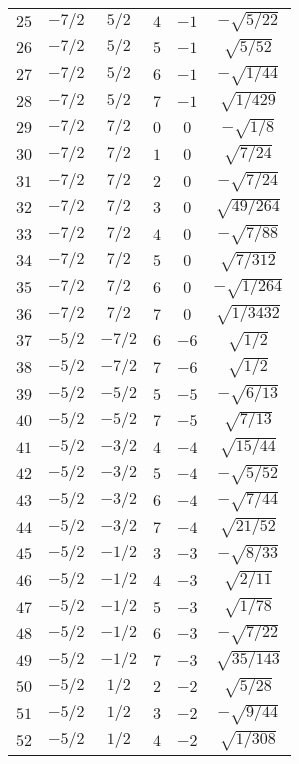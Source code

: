 \begin{table}
\begin{center}
\begin{tabular}{|c|c|c|c|c|c|}
$25$ & $-7/2$ & $5/2$ & $4$ & $-1$ & $-\sqrt{5/22}$ \\ 
$26$ & $-7/2$ & $5/2$ & $5$ & $-1$ & $\sqrt{5/52}$ \\ 
$27$ & $-7/2$ & $5/2$ & $6$ & $-1$ & $-\sqrt{1/44}$ \\ 
$28$ & $-7/2$ & $5/2$ & $7$ & $-1$ & $\sqrt{1/429}$ \\ 
$29$ & $-7/2$ & $7/2$ & $0$ & $0$ & $-\sqrt{1/8}$ \\ 
$30$ & $-7/2$ & $7/2$ & $1$ & $0$ & $\sqrt{7/24}$ \\ 
$31$ & $-7/2$ & $7/2$ & $2$ & $0$ & $-\sqrt{7/24}$ \\ 
$32$ & $-7/2$ & $7/2$ & $3$ & $0$ & $\sqrt{49/264}$ \\ 
$33$ & $-7/2$ & $7/2$ & $4$ & $0$ & $-\sqrt{7/88}$ \\ 
$34$ & $-7/2$ & $7/2$ & $5$ & $0$ & $\sqrt{7/312}$ \\ 
$35$ & $-7/2$ & $7/2$ & $6$ & $0$ & $-\sqrt{1/264}$ \\ 
$36$ & $-7/2$ & $7/2$ & $7$ & $0$ & $\sqrt{1/3432}$ \\ 
$37$ & $-5/2$ & $-7/2$ & $6$ & $-6$ & $\sqrt{1/2}$ \\ 
$38$ & $-5/2$ & $-7/2$ & $7$ & $-6$ & $\sqrt{1/2}$ \\ 
$39$ & $-5/2$ & $-5/2$ & $5$ & $-5$ & $-\sqrt{6/13}$ \\ 
$40$ & $-5/2$ & $-5/2$ & $7$ & $-5$ & $\sqrt{7/13}$ \\ 
$41$ & $-5/2$ & $-3/2$ & $4$ & $-4$ & $\sqrt{15/44}$ \\ 
$42$ & $-5/2$ & $-3/2$ & $5$ & $-4$ & $-\sqrt{5/52}$ \\ 
$43$ & $-5/2$ & $-3/2$ & $6$ & $-4$ & $-\sqrt{7/44}$ \\ 
$44$ & $-5/2$ & $-3/2$ & $7$ & $-4$ & $\sqrt{21/52}$ \\ 
$45$ & $-5/2$ & $-1/2$ & $3$ & $-3$ & $-\sqrt{8/33}$ \\ 
$46$ & $-5/2$ & $-1/2$ & $4$ & $-3$ & $\sqrt{2/11}$ \\ 
$47$ & $-5/2$ & $-1/2$ & $5$ & $-3$ & $\sqrt{1/78}$ \\ 
$48$ & $-5/2$ & $-1/2$ & $6$ & $-3$ & $-\sqrt{7/22}$ \\ 
$49$ & $-5/2$ & $-1/2$ & $7$ & $-3$ & $\sqrt{35/143}$ \\ 
$50$ & $-5/2$ & $1/2$ & $2$ & $-2$ & $\sqrt{5/28}$ \\ 
$51$ & $-5/2$ & $1/2$ & $3$ & $-2$ & $-\sqrt{9/44}$ \\ 
$52$ & $-5/2$ & $1/2$ & $4$ & $-2$ & $\sqrt{1/308}$ \\ 

\end{tabular}
\end{center}
\end{table}
